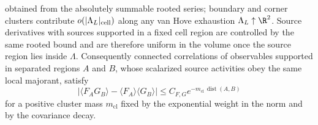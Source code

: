 \begin{theorem}
obtained from the absolutely summable rooted series; boundary and corner
clusters contribute \(o(|\Lambda_L|_{\rm cell})\) along any van Hove
exhaustion \(\Lambda_L\uparrow\R^2\).  Source derivatives with sources
supported in a fixed cell region are controlled by the same rooted bound and
are therefore uniform in the volume once the source region lies inside
\(\Lambda\).
Consequently connected correlations of observables supported in separated
regions \(A\) and \(B\), whose scalarized source activities obey the same local
majorant, satisfy
\begin{equation}
  |\langle F_A G_B\rangle-\langle F_A\rangle\langle G_B\rangle|
  \leq
  C_{F,G}e^{-m_{\mathrm{cl}}\,\operatorname{dist}(A,B)}
  \label{eq:constructive-exponential-clustering-bound}
\end{equation}
for a positive cluster mass \(m_{\mathrm{cl}}\) fixed by the exponential
weight in the norm and by the covariance decay.
\end{theorem}

